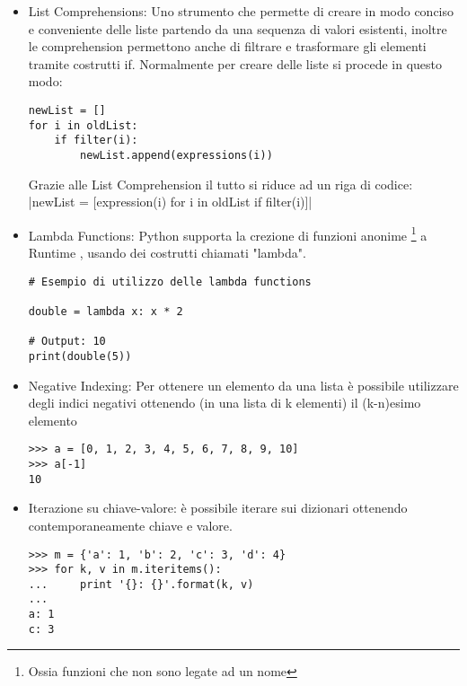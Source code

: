 \begin{itemize}
\item List Comprehensions: Uno strumento che permette di creare in modo conciso e conveniente delle liste partendo da una sequenza di valori esistenti, inoltre le comprehension permettono anche di filtrare e trasformare gli elementi tramite costrutti if.
Normalmente per creare delle liste si procede in questo modo:
\begin{listing}[H]
\begin{verbatim}
newList = []
for i in oldList:
    if filter(i):
        newList.append(expressions(i))
\end{verbatim}
\end{listing}

Grazie alle List Comprehension il tutto si riduce ad un riga di codice:
|newList = [expression(i) for i in oldList if filter(i)]|

\item Lambda Functions: Python supporta la crezione di funzioni anonime \footnote{Ossia funzioni che non sono legate ad un nome} a Runtime , usando dei costrutti chiamati "lambda".  
\begin{listing}[H]
\begin{verbatim}
# Esempio di utilizzo delle lambda functions

double = lambda x: x * 2

# Output: 10
print(double(5))
\end{verbatim}
\end{listing}
\item Negative Indexing: Per ottenere un elemento da una lista è possibile utilizzare degli indici negativi ottenendo (in una lista di k elementi) il (k-n)esimo elemento
\begin{listing}[H]
\begin{verbatim}
>>> a = [0, 1, 2, 3, 4, 5, 6, 7, 8, 9, 10]
>>> a[-1]
10
\end{verbatim}
\end{listing}
\item Iterazione su chiave-valore: è possibile iterare sui dizionari ottenendo contemporaneamente chiave e valore.
\begin{listing}[H]
\begin{verbatim}
>>> m = {'a': 1, 'b': 2, 'c': 3, 'd': 4}
>>> for k, v in m.iteritems():
...     print '{}: {}'.format(k, v)
...
a: 1
c: 3
\end{verbatim}
\end{listing}

\end{itemize}


